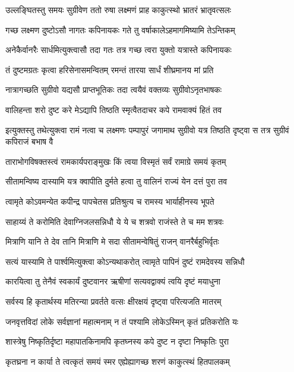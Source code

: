 \twolineshloka
{उल्लङ्घितस्तु समयः सुग्रीवेण ततो रुषा}
{लक्ष्मणं प्राह काकुत्स्थो भ्रातरं भ्रातृवत्सलः} %

\twolineshloka
{गच्छ लक्ष्मण दुष्टोऽसौ नागतः कपिनायकः}
{गते तु वर्षाकालेऽहमागमिष्यामि तेऽन्तिकम्} %

\twolineshloka
{अनेकैर्वानरैः सार्धमित्युक्त्वासौ तदा गतः}
{तत्र गच्छ त्वरा युक्तो यत्रास्ते कपिनायकः} %

\twolineshloka
{तं दुष्टमग्रतः कृत्वा हरिसेनासमन्वितम्}
{रमन्तं तारया सार्धं शीघ्रमानय मां प्रति} %

\twolineshloka
{नात्रागच्छति सुग्रीवो यद्यसौ प्राप्तभूतिकः}
{तदा त्वयैवं वक्तव्यः सुग्रीवोऽनृतभाषकः} %

\twolineshloka
{वालिहन्ता शरो दुष्ट करे मेऽद्यापि तिष्ठति}
{स्मृत्वैतदाचर कपे रामवाक्यं हितं तव} %

\threelineshloka
{इत्युक्तस्तु तथेत्युक्त्वा रामं नत्वा च लक्ष्मणः}
{पम्पापुरं जगामाथ सुग्रीवो यत्र तिष्ठति}
{दृष्ट्वा स तत्र सुग्रीवं कपिराजं बभाष वै} %

\twolineshloka
{ताराभोगविषक्तस्त्वं रामकार्यपराङ्मुखः}
{किं त्वया विस्मृतं सर्वं रामाग्रे समयं कृतम्} %

\twolineshloka
{सीतामन्विष्य दास्यामि यत्र क्वापीति दुर्मते}
{हत्वा तु वालिनं राज्यं येन दत्तं पुरा तव} %

\twolineshloka
{त्वामृते कोऽवमन्येत कपीन्द्र पापचेतस}
{प्रतिश्रुत्य च रामस्य भार्याहीनस्य भूपते} %

\twolineshloka
{साहाय्यं ते करोमिति देवाग्निजलसन्निधौ}
{ये ये च शत्रवो राजंस्ते ते च मम शत्रवः} %

\twolineshloka
{मित्राणि यानि ते देव तानि मित्राणि मे सदा}
{सीतामन्वेषितुं राजन् वानरैर्बहुभिर्वृतः} %

\twolineshloka
{सत्यं यास्यामि ते पार्श्वमित्युक्त्वा कोऽन्यथाकरोत्}
{त्वामृते पापिनं दुष्टं रामदेवस्य सन्निधौ} %

\twolineshloka
{कारयित्वा तु तेनैवं स्वकार्यं दुष्टवानर}
{ऋषीणां सत्यवद्वाक्यं त्वयि दृष्टं मयाधुना} %

\twolineshloka
{सर्वस्य हि कृतार्थस्य मतिरन्या प्रवर्तते}
{वत्सः क्षीरक्षयं दृष्ट्वा परित्यजति मातरम्} %

\twolineshloka
{जनवृत्तविदां लोके सर्वज्ञानां महात्मनाम्}
{न तं पश्यामि लोकेऽस्मिन् कृतं प्रतिकरोति यः} %

\twolineshloka
{शास्त्रेषु निष्कृतिर्दृष्टा महापातकिनामपि}
{कृतघ्नस्य कपे दुष्ट न दृष्टा निष्कृतिः पुरा} %

\twolineshloka
{कृतघ्रना न कार्या ते त्वत्कृतं समयं स्मर}
{एह्येह्यागच्छ शरणं काकुत्स्थं हितपालकम्} %

